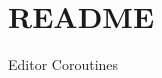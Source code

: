 \chapter{README}
\hypertarget{md__library_2_package_cache_2com_8unity_8editorcoroutines_0d1_80_80_2_r_e_a_d_m_e}{}\label{md__library_2_package_cache_2com_8unity_8editorcoroutines_0d1_80_80_2_r_e_a_d_m_e}
Editor Coroutines 